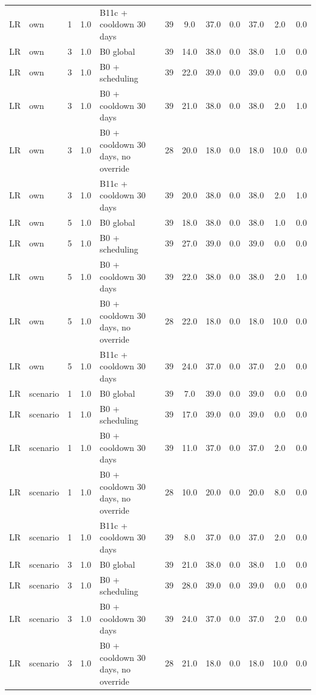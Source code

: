 \documentclass[10pt,onecolumn,letterpaper]{article}
\begin{document}
\begin{longtable}{lllllccccccc}
LR & own & 1 & 1.0 & B11c + cooldown 30 days & 39 & 9.0 & 37.0 & 0.0 & 37.0 & 2.0 & 0.0 \\
LR & own & 3 & 1.0 & B0 global & 39 & 14.0 & 38.0 & 0.0 & 38.0 & 1.0 & 0.0 \\
LR & own & 3 & 1.0 & B0 + scheduling & 39 & 22.0 & 39.0 & 0.0 & 39.0 & 0.0 & 0.0 \\
LR & own & 3 & 1.0 & B0 + cooldown 30 days & 39 & 21.0 & 38.0 & 0.0 & 38.0 & 2.0 & 1.0 \\
LR & own & 3 & 1.0 & B0 + cooldown 30 days, no override & 28 & 20.0 & 18.0 & 0.0 & 18.0 & 10.0 & 0.0 \\
LR & own & 3 & 1.0 & B11c + cooldown 30 days & 39 & 20.0 & 38.0 & 0.0 & 38.0 & 2.0 & 1.0 \\
LR & own & 5 & 1.0 & B0 global & 39 & 18.0 & 38.0 & 0.0 & 38.0 & 1.0 & 0.0 \\
LR & own & 5 & 1.0 & B0 + scheduling & 39 & 27.0 & 39.0 & 0.0 & 39.0 & 0.0 & 0.0 \\
LR & own & 5 & 1.0 & B0 + cooldown 30 days & 39 & 22.0 & 38.0 & 0.0 & 38.0 & 2.0 & 1.0 \\
LR & own & 5 & 1.0 & B0 + cooldown 30 days, no override & 28 & 22.0 & 18.0 & 0.0 & 18.0 & 10.0 & 0.0 \\
LR & own & 5 & 1.0 & B11c + cooldown 30 days & 39 & 24.0 & 37.0 & 0.0 & 37.0 & 2.0 & 0.0 \\
LR & scenario & 1 & 1.0 & B0 global & 39 & 7.0 & 39.0 & 0.0 & 39.0 & 0.0 & 0.0 \\
LR & scenario & 1 & 1.0 & B0 + scheduling & 39 & 17.0 & 39.0 & 0.0 & 39.0 & 0.0 & 0.0 \\
LR & scenario & 1 & 1.0 & B0 + cooldown 30 days & 39 & 11.0 & 37.0 & 0.0 & 37.0 & 2.0 & 0.0 \\
LR & scenario & 1 & 1.0 & B0 + cooldown 30 days, no override & 28 & 10.0 & 20.0 & 0.0 & 20.0 & 8.0 & 0.0 \\
LR & scenario & 1 & 1.0 & B11c + cooldown 30 days & 39 & 8.0 & 37.0 & 0.0 & 37.0 & 2.0 & 0.0 \\
LR & scenario & 3 & 1.0 & B0 global & 39 & 21.0 & 38.0 & 0.0 & 38.0 & 1.0 & 0.0 \\
LR & scenario & 3 & 1.0 & B0 + scheduling & 39 & 28.0 & 39.0 & 0.0 & 39.0 & 0.0 & 0.0 \\
LR & scenario & 3 & 1.0 & B0 + cooldown 30 days & 39 & 24.0 & 37.0 & 0.0 & 37.0 & 2.0 & 0.0 \\
LR & scenario & 3 & 1.0 & B0 + cooldown 30 days, no override & 28 & 21.0 & 18.0 & 0.0 & 18.0 & 10.0 & 0.0 \\

\end{longtable}
\end{document}
